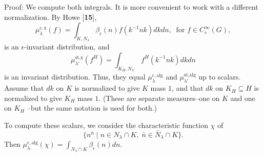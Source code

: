\documentclass{amsart}
\begin{document}
\pproclaim Proof:
We compute both integrals.
It is more convenient to work with a different normalization.
By Howe [{\bf 15}],
%
$$
  \mu_{\lambda}^{\epsilon,\text{x}}
  (f) =
  \int_{ K, N_{\lambda} }
  \beta_{\epsilon} (n) 
  f (k^{-1}nk) dkdn, \ \text{ for }
  f \in 
  C_c^{\infty} (G),
$$
%
is an $\epsilon$-invariant distribution, and
%
$$
  \mu_{\lambda'}^{\text{st,x}} (f^H) =
  \int_{K_H,N_{\lambda'}}
  f^H
  (k^{-1}nk)
  dkdn 
$$
%
is an invariant distribution.
Thus, they equal
  $ \mu_{\lambda}^{\epsilon, \text{alg}}$ and
    $\mu_{\lambda'}^{\text{st,alg}} $
up to scalars.
Assume that $dk$ on $K$ is normalized to give $K$ mass $1$, and
that $dk$ on
  $ K_H \subseteq H $
is normalized to give 
  $ K_H $
mass $1$.
(These are separate measures--one on $K$ and one on
  $ K_H $
--but the same notation is used for both.)

To compute these scalars, we consider the characteristic function $\chi$
 of 
%
$$
   \{
      n^{\bar n} \mid
      n \in N_{\lambda} \cap K, \;
      \bar n \in \bar N_{\lambda} \cap K 
    \}.
$$
%
Then 
  $ \mu_{\lambda}^{\epsilon,\text{alg}}
    (\chi) =
    \int_{ N_{\lambda}\cap K }
    \beta_{\epsilon} (n) d n $.
\end{document}
